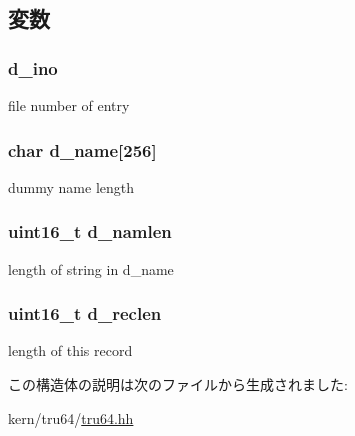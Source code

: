 \subsection{変数}
\hypertarget{structTru64_1_1dirent_a3fb8db68a229e05567ff4874104aed4b}{
\subsubsection[{d\_\-ino}]{ {\bf d\_\-ino}}}
\label{structTru64_1_1dirent_a3fb8db68a229e05567ff4874104aed4b}


file number of entry \hypertarget{structTru64_1_1dirent_a156ab9c5b093392ec66d64794aa91260}{
\subsubsection[{d\_\-name}]{\setlength{\rightskip}{0pt plus 5cm}char {\bf d\_\-name}\mbox{[}256\mbox{]}}}
\label{structTru64_1_1dirent_a156ab9c5b093392ec66d64794aa91260}


dummy name length \hypertarget{structTru64_1_1dirent_aa87b10da682d903e5c780d7cfaa4ee82}{
\subsubsection[{d\_\-namlen}]{\setlength{\rightskip}{0pt plus 5cm}uint16\_\-t {\bf d\_\-namlen}}}
\label{structTru64_1_1dirent_aa87b10da682d903e5c780d7cfaa4ee82}


length of string in d\_\-name \hypertarget{structTru64_1_1dirent_a14f5c4b79ce9b7772e5033ac64644c63}{
\subsubsection[{d\_\-reclen}]{\setlength{\rightskip}{0pt plus 5cm}uint16\_\-t {\bf d\_\-reclen}}}
\label{structTru64_1_1dirent_a14f5c4b79ce9b7772e5033ac64644c63}


length of this record 

この構造体の説明は次のファイルから生成されました:\begin{DoxyCompactItemize}
\item 
kern/tru64/\hyperlink{kern_2tru64_2tru64_8hh}{tru64.hh}\end{DoxyCompactItemize}
